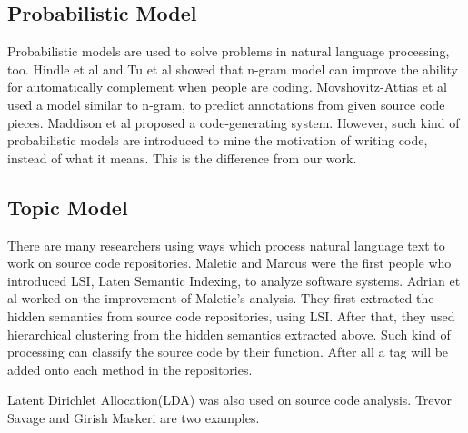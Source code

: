 \subsection{Probabilistic Model}
Probabilistic models are used to solve problems in natural language processing, too. Hindle et al\cite{hindle2012naturalness} and Tu et al\cite{tu2014localness}
showed that n-gram model can improve the ability for automatically
complement when people are coding.
Movshovitz-Attias et al\cite{movshovitz2013natural} used a model similar to n-gram,
to predict annotations from given source code pieces.
Maddison et al\cite{maddison2014structured} proposed a code-generating system.
However, such kind of probabilistic models are introduced to mine the motivation of
writing code, instead of what it means. This is the difference from our work.

\subsection{Topic Model}
There are many researchers using ways which process natural language text to
work on source code repositories. Maletic and Marcus\cite{maletic2000using} were
the first people who introduced LSI, Laten Semantic Indexing, to analyze software
systems. Adrian et al\cite{kuhn2007semantic} worked on the improvement of Maletic's
analysis. They first extracted the hidden semantics from source code repositories,
using LSI. After that, they used hierarchical clustering from the hidden semantics
extracted above. Such kind of processing can classify the source code by their
function. After all a tag will be added onto each method in the repositories.

Latent Dirichlet Allocation(LDA) was also used on source code analysis. Trevor
Savage\cite{savage2010topic} and Girish Maskeri\cite{maskeri2008mining} are two
examples.
